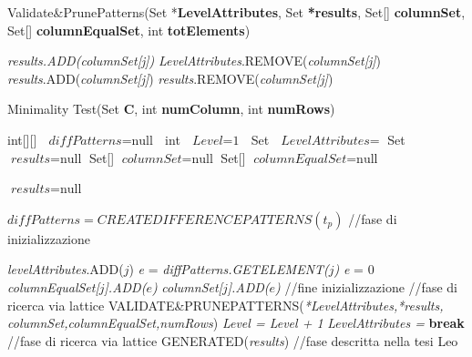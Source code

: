 \begin{algorithm}
	\caption{Validate\&PrunePatterns(Set *\textbf{LevelAttributes}, Set \textbf{*results}, Set[] \textbf{columnSet}, Set[] \textbf{columnEqualSet}, int \textbf{totElements})}\label{validateeprunepattern}
	\begin{algorithmic}[1]	
		
		
		\State \textit{results.ADD(columnSet[j])}
		\State \textit{LevelAttributes}.REMOVE(\textit{columnSet[j]})
		\State \textit{results}.ADD(\textit{columnSet[j]})
		\State \textit{results}.REMOVE(\textit{columnSet[j]})
		
		\EndIf
		\EndFor
	\end{algorithmic}
\end{algorithm}
\begin{algorithm}
	\caption{Minimality Test(Set \textbf{C}, int \textbf{numColumn}, int \textbf{numRows})}\label{euclid}
	\begin{algorithmic}[1]	
		\State int[][] $\textit{ diffPatterns} = \text{null }$
		\State int $\textit{ Level} = \text{1 }$
		\State Set $\textit{ LevelAttributes} = \text{}$
        \State Set $\textit{results} = \text{null}$
        \State Set[] $\textit{columnSet} = \text{null}$
        \State Set[] $\textit{columnEqualSet} = \text{null}$

\State $\textit{results} = \text{null}$

\State $\textit{diffPatterns} = CREATEDIFFERENCEPATTERNS(t_p)$
\State //fase di inizializzazione

\State \textit{levelAttributes}.ADD($j$)
\EndFor
{}
\State \textit{e} = \textit{diffPatterns.GETELEMENT($j$)}
\If \textit{e} = 0
\State \textit{columnEqualSet[$j$].ADD($e$)}
\State \textit{columnSet[$j$].ADD($e$)}
\EndIf
\EndFor
\EndFor
\State //fine inizializzazione
\State //fase di ricerca via lattice
\State VALIDATE\&PRUNEPATTERNS(\textit{*LevelAttributes,*results,
\State columnSet,columnEqualSet,numRows})
\State \textit{Level = Level + 1}
\State \textit{LevelAttributes = }
\State \textbf{break}
\EndIf
\EndWhile
\State //fase di ricerca via lattice
\EndFor
\State GENERATED(\textit{results}) //fase descritta nella tesi Leo
\EndFor
	\end{algorithmic}
\end{algorithm}